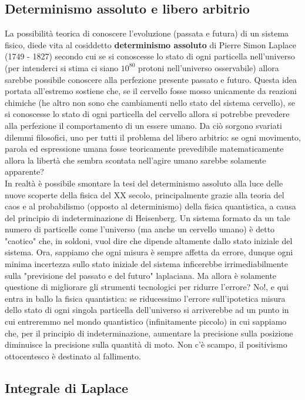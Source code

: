 \documentclass[10pt,a4paper]{article}
\begin{document}
\subsection{Determinismo assoluto e libero arbitrio}
La possibilità teorica di conoscere l'evoluzione (passata e futura) di un sistema fisico, diede vita al cosiddetto \textbf{determinismo assoluto} di Pierre Simon Laplace (1749 - 1827) secondo cui se si conoscesse lo stato di ogni particella nell'universo (per intenderci si stima ci siano $10^{80}$ protoni nell'universo osservabile) allora sarebbe possibile conoscere alla perfezione presente passato e futuro. Questa idea portata all'estremo sostiene che, se il cervello fosse mosso unicamente da reazioni chimiche (he altro non sono che cambiamenti nello stato del sistema cervello), se si conoscesse lo stato di ogni particella del cervello allora si potrebbe prevedere alla perfezione il comportamento di un essere umano. Da ciò sorgono svariati dilemmi filosofici, uno per tutti il problema del libero arbitrio: se ogni movimento, parola ed espressione umana fosse teoricamente prevedibile matematicamente allora la libertà che sembra scontata nell'agire umano sarebbe solamente apparente?\\
In realtà è possibile smontare la tesi del determinismo assoluto alla luce delle nuove scoperte della fisica del XX secolo, principalmente grazie alla teoria del caos e al probabilismo (opposto al determinismo) della fisica quantistica, a causa del principio di indeterminazione di Heisenberg. Un sistema formato da un tale numero di particelle come l'universo (ma anche un cervello umano) è detto "caotico" che, in soldoni, vuol dire che dipende altamente dallo stato iniziale del sistema. Ora, sappiamo che ogni misura è sempre affetta da errore, dunque ogni minima incertezza sullo stato iniziale del sistema inficerebbe irrimediabilmente sulla "previsione del passato e del futuro" laplaciana. Ma allora è solamente questione di migliorare gli strumenti tecnologici per ridurre l'errore? No!, e qui entra in ballo la fisica quantistica: se riducessimo l'errore sull'ipotetica misura dello stato di ogni singola particella dell'universo si arriverebbe ad un punto in cui entreremmo nel mondo quantistico (infinitamente piccolo) in cui sappiamo che, per il principio di indeterminazione, aumentare la precisione sulla posizione diminuisce la precisione sulla quantità di moto. Non c'è scampo, il positivismo ottocentesco è destinato al fallimento. 
\subsection{Integrale di Laplace}\label{subsec:laplaceint}
\end{document}
